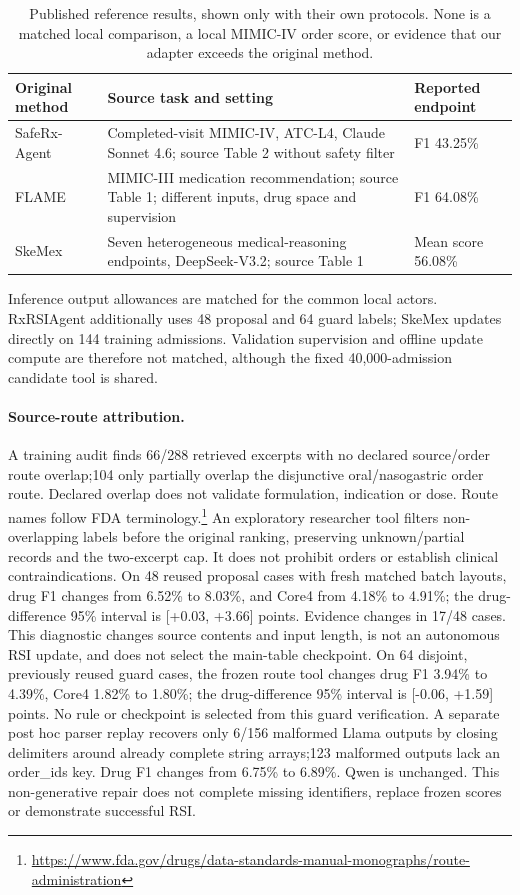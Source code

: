 \begin{table}[t]
\setlength{\tabcolsep}{4pt}
\caption{Published reference results, shown only with their own protocols. None is a matched local comparison, a local MIMIC-IV order score, or evidence that our adapter exceeds the original method.}
\label{tab:published-prescribing}
\begin{tabular}{@{}p{3.1cm}p{7.5cm}p{3.5cm}@{}}\toprule
Original method & Source task and setting & Reported endpoint\\\midrule
SafeRx-Agent \citep{saferx} & Completed-visit MIMIC-IV, ATC-L4, Claude Sonnet 4.6; source Table 2 without safety filter & F1 43.25\%\\
FLAME \citep{flame} & MIMIC-III medication recommendation; source Table 1; different inputs, drug space and supervision & F1 64.08\%\\
SkeMex \citep{skemex} & Seven heterogeneous medical-reasoning endpoints, DeepSeek-V3.2; source Table 1 & Mean score 56.08\%\\
\bottomrule\end{tabular}
\end{table}Inference output allowances are matched for the common local actors. RxRSIAgent additionally uses 48 proposal and 64 guard labels; SkeMex updates directly on 144 training admissions. Validation supervision and offline update compute are therefore not matched, although the fixed 40,000-admission candidate tool is shared.\paragraph{Source-route attribution.} A training audit finds 66/288 retrieved excerpts with no declared source/order route overlap;104 only partially overlap the disjunctive oral/nasogastric order route. Declared overlap does not validate formulation, indication or dose. Route names follow FDA terminology.\footnote{\url{https://www.fda.gov/drugs/data-standards-manual-monographs/route-administration}} An exploratory researcher tool filters non-overlapping labels before the original ranking, preserving unknown/partial records and the two-excerpt cap. It does not prohibit orders or establish clinical contraindications. On 48 reused proposal cases with fresh matched batch layouts, drug F1 changes from 6.52\% to 8.03\%, and Core4 from 4.18\% to 4.91\%; the drug-difference 95\% interval is [+0.03, +3.66] points. Evidence changes in 17/48 cases. This diagnostic changes source contents and input length, is not an autonomous RSI update, and does not select the main-table checkpoint. On 64 disjoint, previously reused guard cases, the frozen route tool changes drug F1 3.94\% to 4.39\%, Core4 1.82\% to 1.80\%; the drug-difference 95\% interval is [-0.06, +1.59] points. No rule or checkpoint is selected from this guard verification. A separate post hoc parser replay recovers only 6/156 malformed Llama outputs by closing delimiters around already complete string arrays;123 malformed outputs lack an order\_ids key. Drug F1 changes from 6.75\% to 6.89\%. Qwen is unchanged. This non-generative repair does not complete missing identifiers, replace frozen scores or demonstrate successful RSI.

